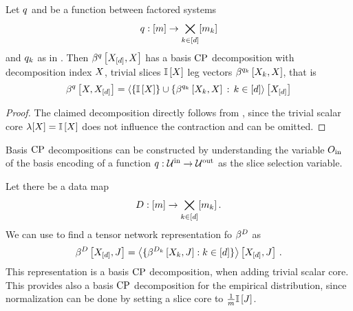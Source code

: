 \begin{theorem}
    \label{the:functionDecompositionBasisCP}
    Let $q$ and be a function between factored systems
    \begin{align*}
        q : [m] \rightarrow  \bigtimes_{k\in[d]}[m_{k}]
    \end{align*}
    and $q_{k}$ as in .
    Then $\beta^{q}\left[X_{[d]},X\right]$ has a basis $\mathrm{CP}$ decomposition with decomposition index $X$, trivial slices $\mathbb{I}\left[X\right]$ leg vectors $\beta^{q_{k}}\left[X_{k},X\right]$, that is
    \begin{align*}
        \beta^{q}\left[X,X_{[d]}\right]
        = \left\langle \{\mathbb{I}\left[X\right]\} \cup \{\beta^{q_{k}}\left[X_{k},X\right]\,:\,k\in[d]\right\rangle \left[ X_{[d]} \right]
    \end{align*}
\end{theorem}
\begin{proof}
    The claimed decomposition directly follows from , since the trivial scalar core $\lambda[X]=\mathbb{I}\left[X\right]$ does not influence the contraction and can be omitted.
\end{proof}

Basis $\mathrm{CP}$ decompositions can be constructed by understanding the variable $O_{\mathrm{in}}$ of the basis encoding of a function $q:\mathcal{U}^{\mathrm{in}} \rightarrow \mathcal{U}^{\mathrm{out}}$ as the slice selection variable.

\begin{example}
    \label{exa:empDistCP}
    Let there be a data map
    \begin{align*}
        D : [m] \rightarrow \bigtimes_{k\in[d]}[m_{k}] \, .
    \end{align*}
    We can use  to find a tensor network representation fo $\beta^{D}$ as
    \begin{align*}
        \beta^{D}\left[X_{[d]},J\right]
        = \left\langle 
            \{\beta^{D_{k}}\left[X_{k},J\right] : k\in[d] \}
        \right\rangle \left[ X_{[d]},J \right] \, .
    \end{align*}
    This representation is a basis $\mathrm{CP}$ decomposition, when adding trivial scalar core.
    This provides also a basis $\mathrm{CP}$ decomposition for the empirical distribution, since normalization can be done by setting a slice core to $\frac{1}{m}\mathbb{I}\left[J\right]$.
\end{example}

